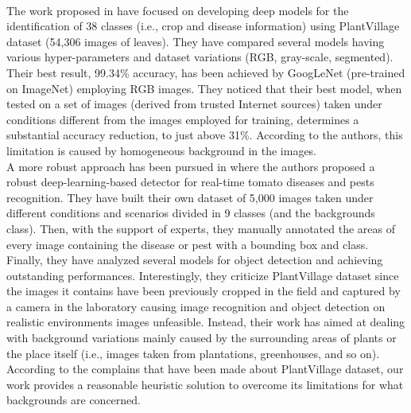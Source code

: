 \\\indent
The work proposed in \cite{erba} have focused on developing deep models for the identification of 38 classes (i.e., crop and disease information) using PlantVillage dataset (54,306 images of leaves). They have compared several models having various hyper-parameters and dataset variations (RGB, gray-scale, segmented). Their best result, 99.34\% accuracy, has been achieved by GoogLeNet (pre-trained on ImageNet) employing RGB images. They noticed that their best model, when tested on a set of images (derived from trusted Internet sources) taken under conditions different from the images employed for training, determines a substantial accuracy reduction, to just above 31\%. According to the authors, this limitation is caused by homogeneous background in the images.
\\\indent
A more robust approach has been pursued in \cite{manzoni} where the authors proposed a robust deep-learning-based detector for real-time tomato diseases and pests recognition. They have built their own dataset of 5,000 images taken under different conditions and scenarios divided in 9 classes (and the backgrounds class). Then, with the support of experts, they manually annotated the areas of every image containing the disease or pest with a bounding box and class. Finally, they have analyzed several models for object detection and achieving outstanding performances. Interestingly, they criticize PlantVillage dataset since the images it contains have been previously cropped in the field and captured by a camera in the laboratory causing image recognition and object detection on realistic environments images unfeasible. Instead, their work has aimed at dealing with background variations mainly caused by the surrounding areas of plants or the place itself (i.e., images taken from plantations, greenhouses, and so on).
\\\indent
According to the complains that have been made about PlantVillage dataset, our work provides a reasonable heuristic solution to overcome its limitations for what backgrounds are concerned.